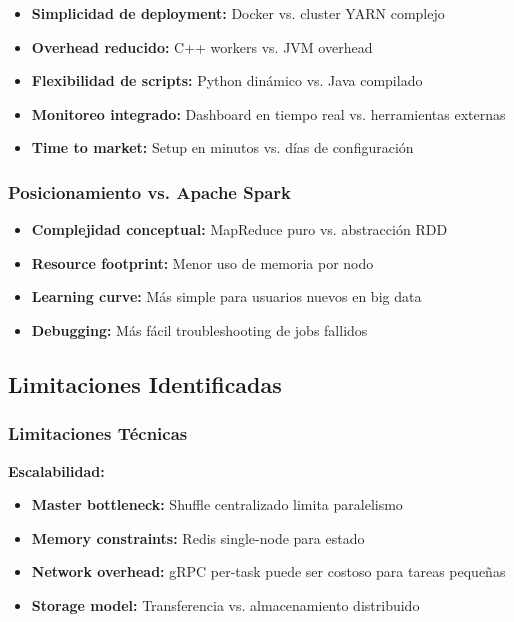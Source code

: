 \begin{itemize}
    \item \textbf{Simplicidad de deployment:} Docker vs. cluster YARN complejo
    \item \textbf{Overhead reducido:} C++ workers vs. JVM overhead
    \item \textbf{Flexibilidad de scripts:} Python dinámico vs. Java compilado
    \item \textbf{Monitoreo integrado:} Dashboard en tiempo real vs. herramientas externas
    \item \textbf{Time to market:} Setup en minutos vs. días de configuración
\end{itemize}

\subsubsection{Posicionamiento vs. Apache Spark}

\begin{itemize}
    \item \textbf{Complejidad conceptual:} MapReduce puro vs. abstracción RDD
    \item \textbf{Resource footprint:} Menor uso de memoria por nodo
    \item \textbf{Learning curve:} Más simple para usuarios nuevos en big data
    \item \textbf{Debugging:} Más fácil troubleshooting de jobs fallidos
\end{itemize}

\subsection{Limitaciones Identificadas}

\subsubsection{Limitaciones Técnicas}

\textbf{Escalabilidad:}
\begin{itemize}
    \item \textbf{Master bottleneck:} Shuffle centralizado limita paralelismo
    \item \textbf{Memory constraints:} Redis single-node para estado
    \item \textbf{Network overhead:} gRPC per-task puede ser costoso para tareas pequeñas
    \item \textbf{Storage model:} Transferencia vs. almacenamiento distribuido
\end{itemize}


